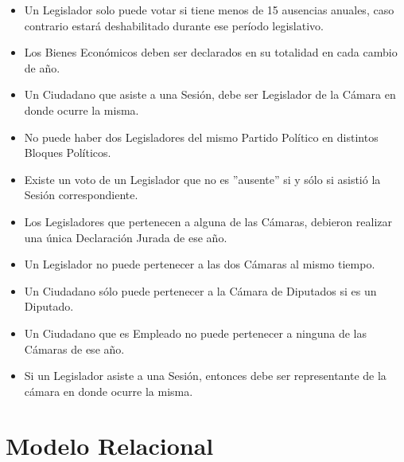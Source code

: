 \begin{itemize}
	\item Un Legislador solo puede votar si tiene menos de 15 ausencias anuales, caso contrario estará deshabilitado durante ese período legislativo.
	\item Los Bienes Económicos deben ser declarados en su totalidad en cada cambio de año.
	\item Un Ciudadano que asiste a una Sesión, debe ser Legislador de la Cámara en donde ocurre la misma.
	\item No puede haber dos Legisladores del mismo Partido Político en distintos Bloques Políticos. 
	\item Existe un voto de un Legislador que no es ''ausente'' si y sólo si asistió la Sesión correspondiente.
	\item Los Legisladores que pertenecen a alguna de las Cámaras, debieron realizar una única Declaración Jurada de ese año.
	\item Un Legislador no puede pertenecer a las dos Cámaras al mismo tiempo. 
	\item Un Ciudadano sólo puede pertenecer a la Cámara de Diputados si es un Diputado.
	\item Un Ciudadano que es Empleado no puede pertenecer a ninguna de las Cámaras de ese año.	
	\item Si un Legislador asiste a una Sesión, entonces debe ser representante de la cámara en donde ocurre la misma.

\end{itemize}

\newpage

\section{Modelo Relacional}


